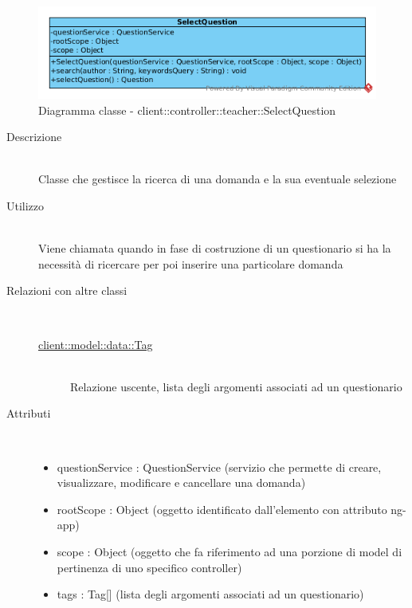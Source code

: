 \vspace{0.5cm}
\hypertarget{client::controller::teacher::SelectQuestion}{}
\begin{center}
			\begin{figure}[H]
				\centering \includegraphics[scale=4, max width=\textwidth, max height=\myheight]{../img/diagrammiClassi/client/controller/teacher/SelectQuestion.png}
				\caption{Diagramma classe - client::controller::teacher::SelectQuestion}
			\end{figure}
		\end{center}\begin{description}
\item[Descrizione] \hfill \\
 Classe che gestisce la ricerca di una domanda e la sua eventuale selezione
\item[Utilizzo] \hfill \\
 Viene chiamata quando in fase di costruzione di un questionario si ha la necessità di ricercare per poi inserire una particolare domanda
\item[Relazioni con altre classi] \hfill \\
 \vspace{-7mm}
\begin{description}
\item[\hyperlink{client::model::data::Tag}{client::model::data::Tag}] \hfill \\
 Relazione uscente, lista degli argomenti associati ad un questionario
\end{description}

\item[Attributi] \hfill \\
 \vspace{-7mm}
\begin{itemize}
\item questionService : QuestionService (servizio che permette di creare, visualizzare, modificare e cancellare una domanda)
\item rootScope : Object (oggetto identificato dall’elemento con attributo ng-app)
\item scope : Object (oggetto che fa riferimento ad una porzione di model di pertinenza di uno specifico controller)
\item tags  : Tag[] (lista degli argomenti associati ad un questionario)
\end{itemize}


\end{description}
